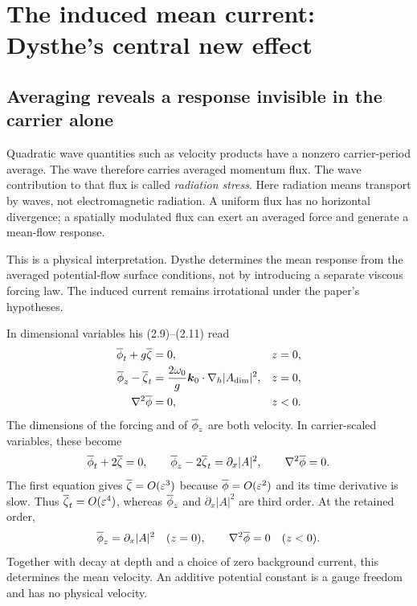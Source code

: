 \section{The induced mean current: Dysthe's central new effect}
\label{sec:mean}
\subsection{Averaging reveals a response invisible in the carrier alone}
Quadratic wave quantities such as velocity products have a nonzero
carrier-period average. The wave therefore carries averaged momentum flux.
The wave contribution to that flux is called \emph{radiation stress}.
Here radiation means transport by waves, not electromagnetic radiation.
A uniform flux has no horizontal divergence; a spatially modulated flux
can exert an averaged force and generate a mean-flow response.

This is a physical interpretation. Dysthe determines the mean response
from the averaged potential-flow surface conditions, not by introducing
a separate viscous forcing law. The induced current remains irrotational
under the paper's hypotheses.

In dimensional variables his (2.9)--(2.11) read
\begin{align*}
 \overline{\phi}_t+g\overline{\zeta}&=0,&&z=0,\\
 \overline{\phi}_z-\overline{\zeta}_t&=\frac{2\omega_0}{g}\boldsymbol{k}_0\cdot
                   \nabla_h|A_{\rm dim}|^2,&&z=0,\\
 \nabla^2\overline{\phi}&=0,&&z<0.
\end{align*}
The dimensions of the forcing and of $\overline{\phi}_z$ are both velocity.
In carrier-scaled variables, these become
\begin{equation}\label{eq:mean-full}
 \overline{\phi}_t+2\overline{\zeta}=0,\qquad
 \overline{\phi}_z-2\overline{\zeta}_t=\partial_x|A|^2,\qquad
 \nabla^2\overline{\phi}=0.
\end{equation}
The first equation gives $\overline{\zeta}=O(\varepsilon^3)$ because
$\overline{\phi}=O(\varepsilon^2)$ and its time derivative is slow.
Thus $\overline{\zeta}_t=O(\varepsilon^4)$, whereas $\overline{\phi}_z$ and
$\partial_x|A|^2$ are third order. At the retained order,
\begin{equation}\label{eq:mean-bc}
 \overline{\phi}_z=\partial_x|A|^2\quad(z=0),\qquad
 \nabla^2\overline{\phi}=0\quad(z<0).
\end{equation}
Together with decay at depth and a choice of zero background current,
this determines the mean velocity. An additive potential constant is a
gauge freedom and has no physical velocity.

